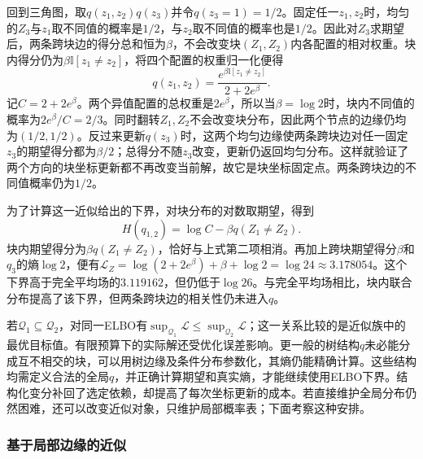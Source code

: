 回到三角图，取$q(z_1,z_2)q(z_3)$并令$q(z_3=1)=1/2$。固定任一$z_1,z_2$时，均匀的$Z_3$与$z_1$取不同值的概率是$1/2$，与$z_2$取不同值的概率也是$1/2$。因此对$Z_3$求期望后，两条跨块边的得分总和恒为$\beta$，不会改变块$(Z_1,Z_2)$内各配置的相对权重。块内得分仍为$\beta\mathbb I[z_1\ne z_2]$，将四个配置的权重归一化便得
\[
  q(z_1,z_2)=
    \frac{e^{\beta\mathbb I[z_1\ne z_2]}}{2+2e^\beta}.
\]
记$C=2+2e^\beta$。两个异值配置的总权重是$2e^\beta$，所以当$\beta=\log2$时，块内不同值的概率为$2e^\beta/C=2/3$。同时翻转$Z_1,Z_2$不会改变块分布，因此两个节点的边缘仍均为$(1/2,1/2)$。反过来更新$q(z_3)$时，这两个均匀边缘使两条跨块边对任一固定$z_3$的期望得分都为$\beta/2$；总得分不随$z_3$改变，更新仍返回均匀分布。这样就验证了两个方向的块坐标更新都不再改变当前解，故它是块坐标固定点。两条跨块边的不同值概率仍为$1/2$。

为了计算这一近似给出的下界，对块分布的对数取期望，得到
\[
  H(q_{1,2})=\log C-\beta q(Z_1\ne Z_2).
\]
块内期望得分为$\beta q(Z_1\ne Z_2)$，恰好与上式第二项相消。再加上跨块期望得分$\beta$和$q_3$的熵$\log2$，便有$\mathcal L_Z=\log(2+2e^\beta)+\beta+\log2=\log24\approx3.178054$。这个下界高于完全平均场的$3.119162$，但仍低于$\log26$。与完全平均场相比，块内联合分布提高了该下界，但两条跨块边的相关性仍未进入$q$。

若$\mathcal Q_1\subseteq\mathcal Q_2$，对同一ELBO有$\sup_{\mathcal Q_1}\mathcal L\leq\sup_{\mathcal Q_2}\mathcal L$；这一关系比较的是近似族中的最优目标值。有限预算下的实际解还受优化误差影响。更一般的树结构$q$未必能分成互不相交的块，可以用树边缘及条件分布参数化，其熵仍能精确计算。这些结构均需定义合法的全局$q$，并正确计算期望和真实熵，才能继续使用ELBO下界。结构化变分补回了选定依赖，却提高了每次坐标更新的成本。若直接维护全局分布仍然困难，还可以改变近似对象，只维护局部概率表；下面考察这种安排。

\subsubsection{基于局部边缘的近似}

\label{sec:pgm-variational-bethe-kikuchi}
\label{sec:pgm-variational-local-free-energy}
\label{sec:pgm-variational-bethe}

